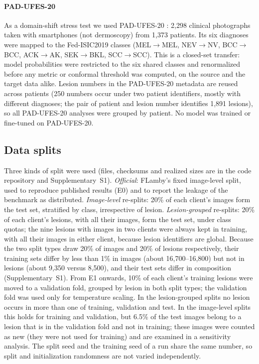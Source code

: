 
\paragraph{PAD-UFES-20} As a domain-shift stress test we used PAD-UFES-20 \cite{pacheco2020pad}:
2,298 clinical photographs taken with smartphones (not dermoscopy) from 1,373 patients. Its six
diagnoses were mapped to the Fed-ISIC2019 classes (MEL$\to$MEL, NEV$\to$NV, BCC$\to$BCC,
ACK$\to$AK, SEK$\to$BKL, SCC$\to$SCC). This is a closed-set transfer: model probabilities were
restricted to the six shared classes and renormalized before any metric or conformal threshold was
computed, on the source and the target data alike. Lesion numbers in the PAD-UFES-20 metadata are
reused across patients (250 numbers occur under two patient identifiers, mostly with different
diagnoses; the pair of patient and lesion number identifies 1,891 lesions), so all PAD-UFES-20 analyses
were grouped by patient. No model was trained or fine-tuned on PAD-UFES-20.

\subsection{Data splits}
\label{sec:splits}

Three kinds of split were used (files, checksums and realized sizes are in the code repository and
Supplementary~S1).
\emph{Official}: FLamby's fixed image-level split, used to reproduce published results (E0) and to
report the leakage of the benchmark as distributed.
\emph{Image-level} re-splits: 20\% of each client's images form the test set, stratified by class,
irrespective of lesion.
\emph{Lesion-grouped} re-splits: 20\% of each client's lesions, with all their images, form the test set,
under class quotas; the nine lesions with images in two clients were always kept in training, with all their images in either client, because lesion identifiers are global. Because the
two split types draw 20\% of images and 20\% of lesions respectively, their training sets differ by less
than 1\% in images (about 16,700--16,800) but not in lesions (about 9,350 versus 8,500), and their test
sets differ in composition (Supplementary~S1). From E1 onwards, 10\% of each client's training lesions
were moved to a validation fold, grouped by lesion in both split types; the validation fold was used only
for temperature scaling. In the lesion-grouped splits no lesion occurs in more than one of training,
validation and test. In the image-level splits this holds for training and validation, but 6.5\% of the
test images belong to a lesion that is in the validation fold and not in training; these images were
counted as new (they were not used for training) and are examined in a sensitivity analysis. The split
seed and the training seed of a run share the same number, so split and initialization randomness are not
varied independently.

